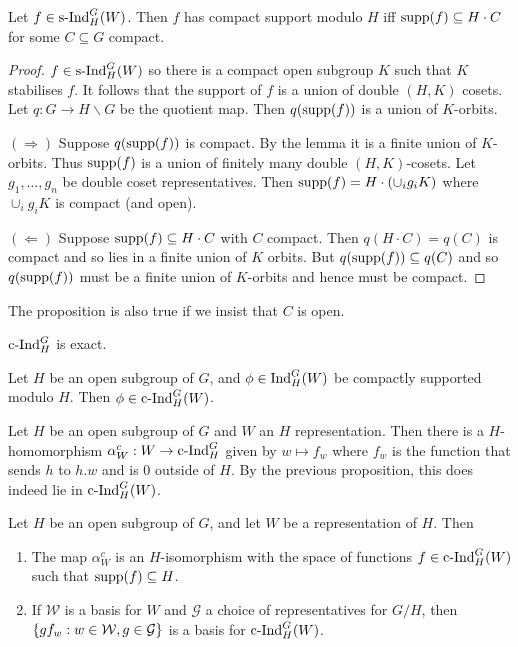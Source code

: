 \documentclass{memoir}
\begin{document}
\begin{proposition}
    Let $f\in \text{s-Ind}_H^G(W)$.
    Then $f$ has compact support modulo $H$ iff $\text{supp}(f) \subseteq H\cdot C$ for some $C\subseteq G$ compact.
\end{proposition}
\begin{proof}
    $f\in\text{s-Ind}_H^G(W)$ so there is a compact open subgroup $K$ such that $K$ stabilises $f$.
    It follows that the support of $f$ is a union of double $(H,K)$ cosets.
    Let $q:G\to H\backslash G$ be the quotient map.
    Then $q(\text{supp}(f))$ is a union of $K$-orbits.

    $(\Rightarrow)$ Suppose $q(\text{supp}(f))$ is compact.
    By the lemma it is a finite union of $K$-orbits.
    Thus $\text{supp}(f)$ is a union of finitely many double $(H,K)$-cosets.
    Let $g_1,\dots,g_n$ be double coset representatives.
    Then $\text{supp}(f) = H\cdot (\cup_ig_iK)$ where $\cup_ig_iK$ is compact (and open).

    $(\Leftarrow)$ Suppose $\text{supp}(f)\subseteq H\cdot C$ with $C$ compact.
    Then $q(H\cdot C) = q(C)$ is compact and so lies in a finite union of $K$ orbits.
    But $q(\text{supp}(f))\subseteq q(C)$ and so $q(\text{supp}(f))$ must be a finite union of $K$-orbits and hence must be compact.
\end{proof}
\begin{remark}
    The proposition is also true if we insist that $C$ is open.
\end{remark}
\begin{proposition}
    $\text{c-Ind}_H^G$ is exact.
\end{proposition}
\begin{proposition}
    Let $H$ be an open subgroup of $G$, and $\phi\in \text{Ind}_H^G(W)$ be compactly supported modulo $H$.
    Then $\phi\in \text{c-Ind}_H^G(W)$.
\end{proposition}
\begin{definition}
    Let $H$ be an open subgroup of $G$ and $W$ an $H$ representation.
    Then there is a $H$-homomorphism $\alpha_W^c:W\to \text{c-Ind}_H^G$ given by $w\mapsto f_w$ where $f_w$ is the function that sends $h$ to $h.w$ and is $0$ outside of $H$.
    By the previous proposition, this does indeed lie in $\text{c-Ind}_H^G(W)$.
\end{definition}
\begin{lemma}
    Let $H$ be an open subgroup of $G$, and let $W$ be a representation of $H$.
    Then
    \begin{enumerate}
        \item The map $\alpha_W^c$ is an $H$-isomorphism with the space of functions $f\in\text{c-Ind}_H^G(W)$ such that $\text{supp}(f)\subseteq H$.
        \item  If $\mathcal W$ is a basis for $W$ and $\mathcal G$ a choice of representatives for $G/H$, then $\lbrace gf_w:w\in \mathcal W,g\in \mathcal G\rbrace$ is a basis for $\text{c-Ind}_H^G(W)$.
    \end{enumerate}
\end{lemma}
\end{document}
